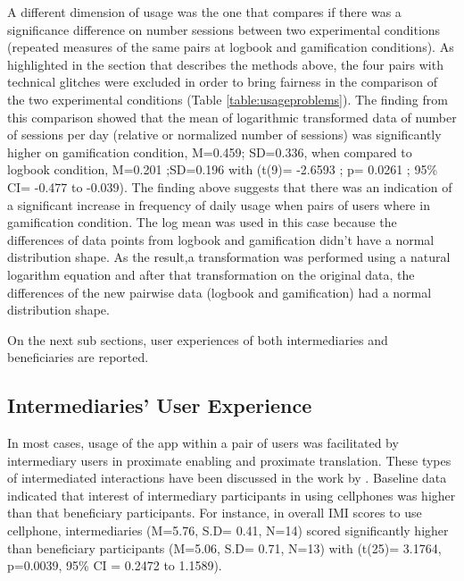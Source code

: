 A different dimension of usage was the one that compares if there was a significance difference on number sessions between two experimental conditions (repeated measures of the same pairs at logbook and gamification conditions). As highlighted in the section that describes the methods above, the four pairs with technical glitches were excluded in order to bring fairness in the comparison of the two experimental conditions (Table \ref{table:usageproblems}). The finding from this comparison showed that the mean of logarithmic transformed data of number of sessions per day (relative or normalized number of sessions) was significantly higher on gamification condition, M=0.459; SD=0.336, when compared to logbook condition, M=0.201 ;SD=0.196 with (t(9)= -2.6593 ; p= 0.0261 ; 95\% CI=  -0.477 to -0.039). The finding above suggests that there was an indication of a significant increase in frequency of daily usage when pairs of users where in gamification condition. The log mean was used in this case because the differences of data points from logbook and gamification didn't have a normal distribution shape. As the result,a transformation was performed using a natural logarithm equation and after that transformation on the original data, the differences of the new pairwise data (logbook and gamification) had a normal distribution shape.

On the next sub sections, user experiences of both intermediaries and beneficiaries are reported.
\subsection{Intermediaries' User Experience}
In most cases, usage of the app within a pair of users was facilitated by intermediary users in proximate enabling and proximate translation. These types of intermediated interactions have been discussed in the work by \cite{sambasivan2010}. Baseline data indicated that interest of intermediary participants in using cellphones was higher than that beneficiary participants. For instance, in overall IMI scores to use cellphone, intermediaries (M=5.76, S.D= 0.41, N=14) scored  significantly higher than beneficiary participants (M=5.06, S.D= 0.71, N=13) with (t(25)= 3.1764, p=0.0039, 95\% CI = 0.2472 to 1.1589).

